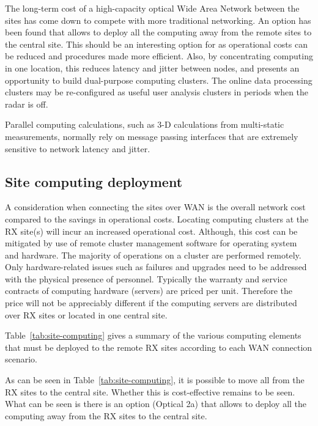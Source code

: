 \documentclass[12pt,a4paper]{article}
\begin{document}
The long-term cost of a high-capacity optical Wide Area Network between the \ED sites has come down to compete with more traditional networking.
An option has been found that allows to deploy all the computing \einfra away from the remote sites to the central site.
This should be an interesting option for \ED as operational costs can be reduced and procedures made more efficient.
Also, by concentrating computing \einfra in one location, this reduces latency and jitter between nodes, and presents an opportunity to build dual-purpose computing clusters.
The online data processing clusters may be re-configured as useful user analysis clusters in periods when the radar is off.

Parallel computing calculations, such as 3-D calculations from multi-static measurements, normally rely on message passing interfaces that are extremely sensitive to network latency and jitter.
\subsection{Site computing deployment} \label{ssec:site-comp}

A consideration when connecting the \ED sites over WAN is the overall network cost compared to the savings in operational costs.
Locating computing clusters at the RX site(s) will incur an increased  operational cost. Although, this cost can be mitigated by use of remote cluster management software for operating system and hardware.
The majority of operations on a cluster are performed remotely.
Only hardware-related issues such as failures and upgrades need to be addressed with the physical presence of personnel. 
Typically the warranty and service contracts of computing hardware (servers) are priced per unit.
Therefore the price will not be appreciably different if the computing servers are distributed over RX sites or located in one central site.

Table~\ref{tab:site-computing} gives a summary of the various computing \einfra elements that must be deployed to the remote RX sites according to each WAN connection scenario.

As can be seen in Table~\ref{tab:site-computing}, it is possible to move all \einfra from the RX sites to the central site. 
Whether this is cost-effective remains to be seen.
What can be seen is there is an option (Optical 2a) that allows to deploy all the computing \einfra away from the RX sites to the central site.
\end{document}
